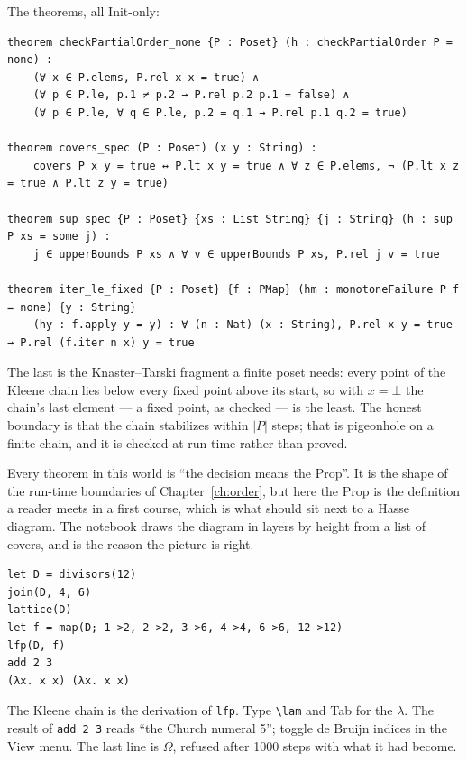 The theorems, all Init-only:

\begin{verbatim}
theorem checkPartialOrder_none {P : Poset} (h : checkPartialOrder P = none) :
    (∀ x ∈ P.elems, P.rel x x = true) ∧
    (∀ p ∈ P.le, p.1 ≠ p.2 → P.rel p.2 p.1 = false) ∧
    (∀ p ∈ P.le, ∀ q ∈ P.le, p.2 = q.1 → P.rel p.1 q.2 = true)

theorem covers_spec (P : Poset) (x y : String) :
    covers P x y = true ↔ P.lt x y = true ∧ ∀ z ∈ P.elems, ¬ (P.lt x z = true ∧ P.lt z y = true)

theorem sup_spec {P : Poset} {xs : List String} {j : String} (h : sup P xs = some j) :
    j ∈ upperBounds P xs ∧ ∀ v ∈ upperBounds P xs, P.rel j v = true

theorem iter_le_fixed {P : Poset} {f : PMap} (hm : monotoneFailure P f = none) {y : String}
    (hy : f.apply y = y) : ∀ (n : Nat) (x : String), P.rel x y = true → P.rel (f.iter n x) y = true
\end{verbatim}

The last is the Knaster--Tarski fragment a finite poset needs: every point of the Kleene chain
lies below every fixed point above its start, so with $x = \bot$ the chain's last element --- a
fixed point, as checked --- is the least. The honest boundary is that the chain stabilizes within
$|P|$ steps; that is pigeonhole on a finite chain, and it is checked at run time rather than
proved.

\begin{logbox}
  Every theorem in this world is ``the decision means the Prop''. It is the shape of the
  run-time boundaries of Chapter~\ref{ch:order}, but here the Prop is the definition a reader
  meets in a first course, which is what should sit next to a Hasse diagram. The notebook draws
  the diagram in layers by height from a list of covers, and  is the reason the
  picture is right.
\end{logbox}

\begin{trybox}
\begin{verbatim}
let D = divisors(12)
join(D, 4, 6)
lattice(D)
let f = map(D; 1->2, 2->2, 3->6, 4->4, 6->6, 12->12)
lfp(D, f)
add 2 3
(λx. x x) (λx. x x)
\end{verbatim}
  The Kleene chain is the derivation of \texttt{lfp}. Type \texttt{\textbackslash lam} and
  Tab for the $\lambda$. The result of \texttt{add 2 3} reads ``the Church numeral 5''; toggle
  de Bruijn indices in the View menu. The last line is $\Omega$, refused after 1000 steps with
  what it had become.
\end{trybox}

